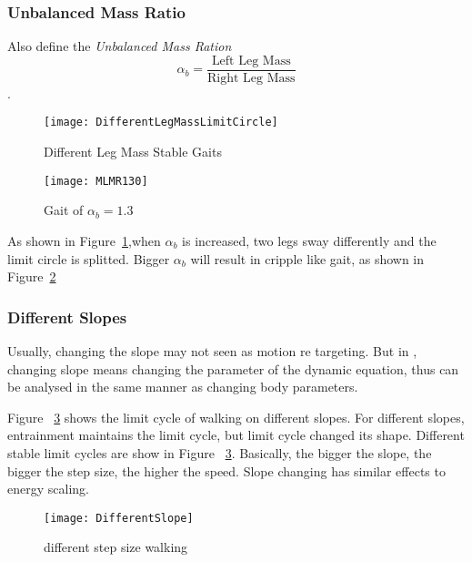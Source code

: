 \subsubsection*{Unbalanced Mass Ratio}
Also define the \emph{Unbalanced Mass Ration} 
\[
\alpha_b=\frac{\text{Left Leg Mass}}{\text{Right Leg Mass}}
\].


\begin{figure}[!htbp]
  \begin{center}
      \texttt{[image: DifferentLegMassLimitCircle]}
    \caption{Different Leg Mass Stable Gaits}
    \label{fig:differentlr}
\end{center}
\end{figure}




\begin{figure}[!htbp]
  \begin{center}
      \texttt{[image: MLMR130]}
    \caption{Gait of $\alpha_b=1.3$}
    \label{fig:lm2}
\end{center}
\end{figure}
As shown in Figure~\ref{fig:differentlr},when $\alpha_b$ is increased, two legs sway differently and the limit circle is splitted.
Bigger $\alpha_b$  will result in cripple like gait, as shown in Figure~\ref{fig:lm2}



\subsubsection*{Different Slopes}
Usually, changing the slope may not seen as motion re targeting.
But in \moit, changing slope means changing the parameter of the dynamic equation, thus can be analysed in the same manner as changing body parameters.


Figure ~\ref{fig:diffslopes} shows the limit cycle of walking on different slopes.
For different slopes, entrainment maintains the limit cycle, but limit cycle changed its shape.
Different stable limit cycles are show in Figure ~\ref{fig:diffslopes}.
Basically, the bigger the slope, the bigger the step size, the higher the speed.
Slope changing has similar effects to energy scaling.



\begin{figure}[!htbp]
  \begin{center}
      \texttt{[image: DifferentSlope]}
    \caption{different step size walking}
    \label{fig:diffslopes}
\end{center}
\end{figure}

